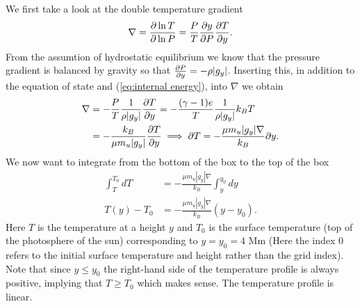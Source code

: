 \documentclass{emulateapj}
\begin{document}
	We first take a look at the double temperature gradient 
	\begin{align}
		\nabla = \pdv{\ln T}{\ln P} = \frac{P}{T}\pdv{y}{P}\pdv{T}{y}.
	\end{align}
	From the assumtion of hydrostatic equilibrium we know that the pressure gradient is balanced by gravity so that $\pdv{P}{y} = -\rho |g_y|$. Inserting this, in addition to the equation of state and (\ref{eq:internal energy}), into $\nabla$ we obtain
	\begin{align}
		\nabla &= -\frac{P}{T}\frac{1}{\rho|g_y|}\pdv{T}{y} = - \frac{(\gamma - 1)e}{T} \frac{1}{\rho |g_y|}k_B T\nonumber\\
		&= - \frac{k_B}{\mu m_u |g_y|}\pdv{T}{y}\implies \partial T = -\frac{\mu m_u |g_y|\nabla}{k_B}\partial y.
	\end{align}
	We now want to integrate from the bottom of the box to the top of the box
	\begin{align}
		\int_{T}^{T_0}dT &= -\frac{\mu m_u |g_y|\nabla}{k_B}\int_{y}^{y_0}dy \\
		T(y) - T_0 &= -\frac{\mu m_u |g_y|\nabla}{k_B}(y - y_0).
		\label{eq:temp}
	\end{align}
	Here $T$ is the temperature at a height $y$ and $T_0$ is the surface temperature (top of the photosphere of the sun) corresponding to $y = y_0 = 4$ Mm (Here the index 0 refers to the initial surface temperature and height rather than the grid index). Note that since $y\leq y_0$ the right-hand side of the temperature profile is always positive, implying that $T\geq T_0$ which makes sense. The temperature profile is linear.
	
\end{document}
